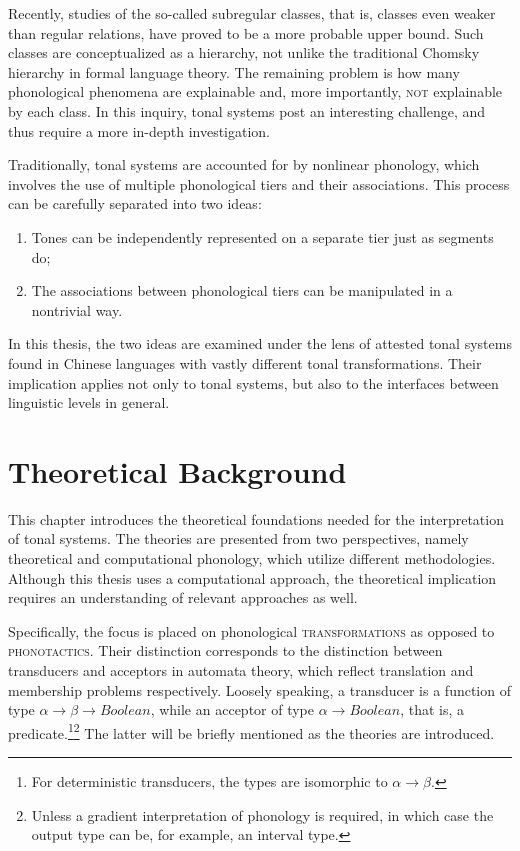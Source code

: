 \documentclass[12pt, a4paper]{report}
\newcommand{\textemph}[1]{\textsc{#1}}
\newcommand{\textterm}[1]{\textsc{#1}\index{#1}}
\begin{document}
Recently, studies of the so-called subregular classes, that is,
classes even weaker than regular relations, have proved to be a more
probable upper bound.  Such classes are conceptualized as a hierarchy,
not unlike the traditional Chomsky hierarchy in formal language
theory.  The remaining problem is how many phonological phenomena are
explainable and, more importantly, \textemph{not} explainable by each
class.  In this inquiry, tonal systems post an interesting challenge,
and thus require a more in-depth investigation.

Traditionally, tonal systems are accounted for by nonlinear phonology,
which involves the use of multiple phonological tiers and their
associations.  This process can be carefully separated into two ideas:
%
\begin{enumerate}
\item Tones can be independently represented on a separate tier just
  as segments do;
\item The associations between phonological tiers can be manipulated
  in a nontrivial way.
\end{enumerate}
%
In this thesis, the two ideas are examined under the lens of attested
tonal systems found in Chinese languages with vastly different tonal
transformations.  Their implication applies not only to tonal systems,
but also to the interfaces between linguistic levels in general.

\tableofcontents

\cleardoublepage
{}

\chapter{Theoretical Background}
This chapter introduces the theoretical foundations needed for the
interpretation of tonal systems.  The theories are presented from two
perspectives, namely theoretical and computational phonology, which
utilize different methodologies.  Although this thesis uses a
computational approach, the theoretical implication requires an
understanding of relevant approaches as well.

Specifically, the focus is placed on phonological
\textterm{transformations} as opposed to \textterm{phonotactics}.
Their distinction corresponds to the distinction between transducers
and acceptors in automata theory, which reflect translation and
membership problems respectively.  Loosely speaking, a transducer is a
function of type \(\alpha \to \beta \to \mathit{Boolean}\), while an
acceptor of type \(\alpha \to \mathit{Boolean}\), that is, a
predicate.\footnote{For deterministic transducers, the types are
  isomorphic to \(\alpha \to \beta\).}\footnote{Unless a gradient
  interpretation of phonology is required, in which case the output
  type can be, for example, an interval type.}  The latter will be
briefly mentioned as the theories are introduced.
\end{document}
